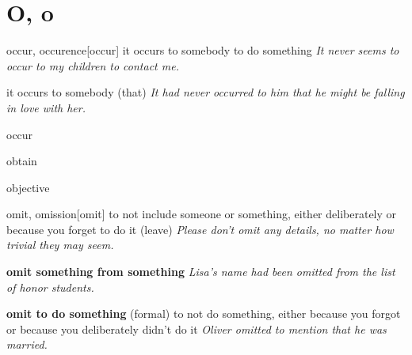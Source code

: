 \section{O, o}

\begin{DefWord}{occur, occurence}[occur]
    it occurs to somebody to do something 
    \textit{It never seems to occur to my children to contact me.}
    
    it occurs to somebody (that)
    \textit{It had never occurred to him that he might be falling in love with her.}
\end{DefWord}

\begin{DefWord}{occur}
\end{DefWord}

\begin{DefWord}{obtain}
\end{DefWord}

\begin{DefWord}{objective}
\end{DefWord}

\begin{DefWord}{omit, omission}[omit]
    to not include someone or something, either deliberately or because you forget to do it (leave)
    \textit{Please don't omit any details, no matter how trivial they may seem.}

    \textbf{omit something from something}
    \textit{Lisa's name had been omitted from the list of honor students.}

    \textbf{omit to do something} (formal) to not do something, either because you forgot or because you deliberately didn't do it
    \textit{Oliver omitted to mention that he was married.}
\end{DefWord}